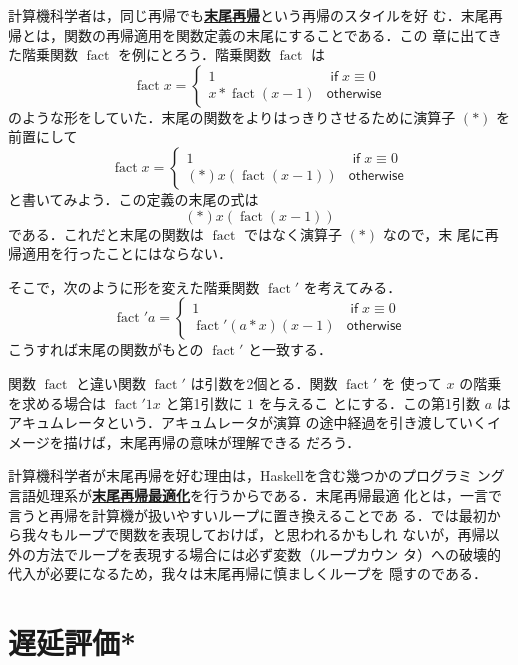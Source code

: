 \documentclass[a5paper,twoside,fleqn]{jsbook}
\newcommand{\programminglanguage}[1]{\textsf{#1}}
\newcommand{\haskell}{\programminglanguage{Haskell}}
\newcommand{\keyword}[1]{{\underline{\textbf{#1}}}}
\newcommand{\mKeyword}[1]{\mathsf{#1}} %
\newcommand{\mIfKeyword}{\mKeyword{if}}
\newcommand{\mOtherwiseKeyword}{\mKeyword{otherwise}}
\DeclareMathOperator{\mIf}{\mIfKeyword}
\DeclareMathOperator{\mOtherwise}{\mOtherwiseKeyword}
\newcommand{\mSpecialFunc}[1]{\mathrm{#1}}
\DeclareMathOperator{\mFact}{\mSpecialFunc{fact}}
\begin{document}
計算機科学者は，同じ再帰でも\keyword{末尾再帰}という再帰のスタイルを好
む．末尾再帰とは，関数の再帰適用を関数定義の末尾にすることである．この
章に出てきた階乗関数 $\mFact$ を例にとろう．階乗関数 $\mFact$ は
\begin{equation}
\mFact x=\begin{cases} 1&\mIf x\equiv0\\ x*\mFact(x-1)&\mOtherwise
\end{cases}
\end{equation}
のような形をしていた．末尾の関数をよりはっきりさせるために演算子 $(*)$
を前置にして
\begin{equation}
\mFact x=\begin{cases} 1&\mIf x\equiv0\\ (*)x(\mFact(x-1))&\mOtherwise
\end{cases}
\end{equation}
と書いてみよう．この定義の末尾の式は
\begin{equation}
(*)x(\mFact(x-1))
\end{equation}
である．これだと末尾の関数は $\mFact$ ではなく演算子 $(*)$ なので，末
尾に再帰適用を行ったことにはならない．

そこで，次のように形を変えた階乗関数 $\mFact'$ を考えてみる．
\begin{equation}
\mFact' a=\begin{cases} 1&\mIf
x\equiv0\\ \mFact'(a*x)(x-1)&\mOtherwise
\end{cases}
\end{equation}
こうすれば末尾の関数がもとの $\mFact'$ と一致する．

関数 $\mFact$ と違い関数 $\mFact'$ は引数を2個とる．関数 $\mFact'$ を
使って $x$ の階乗を求める場合は $\mFact'1x$ と第1引数に $1$ を与えるこ
とにする．この第1引数 $a$ はアキュムレータという．アキュムレータが演算
の途中経過を引き渡していくイメージを描けば，末尾再帰の意味が理解できる
だろう．

計算機科学者が末尾再帰を好む理由は，\haskell を含む幾つかのプログラミ
ング言語処理系が\keyword{末尾再帰最適化}を行うからである．末尾再帰最適
化とは，一言で言うと再帰を計算機が扱いやすいループに置き換えることであ
る．では最初から我々もループで関数を表現しておけば，と思われるかもしれ
ないが，再帰以外の方法でループを表現する場合には必ず変数（ループカウン
  タ）への破壊的代入が必要になるため，我々は末尾再帰に慎ましくループを
隠すのである．

\section{遅延評価*}
\end{document}
